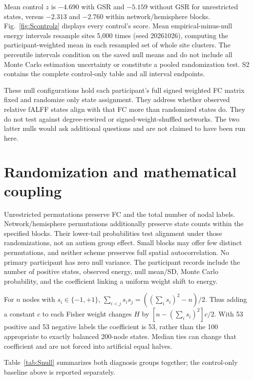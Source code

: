 \documentclass[10pt,letterpaper]{article}
\begin{document}
Mean control $z$ is $-4.690$ with GSR and $-5.159$ without GSR for unrestricted
states, versus $-2.313$ and $-2.760$ within network/hemisphere blocks.
Fig.~\ref{fig:Scontrolz} displays every control's score. Mean empirical-minus-null
energy intervals resample sites 5,000 times (seed 20261026), computing the
participant-weighted mean in each resampled set of whole site clusters. The
percentile intervals condition on the saved null means and do not include all
Monte Carlo estimation uncertainty or constitute a pooled randomization test.
S2 contains the complete control-only table and all interval endpoints.

These null configurations hold each participant's full signed weighted FC matrix
fixed and randomize only state assignment. They address whether observed relative
fALFF states align with that FC more than randomized states do. They do not test
against degree-rewired or signed-weight-shuffled networks. The two latter nulls
would ask additional questions and are not claimed to have been run here.

\section*{Randomization and mathematical coupling}
Unrestricted permutations preserve FC and the total number of nodal labels.
Network/hemisphere permutations additionally preserve state counts within the
specified blocks. Their lower-tail probabilities test alignment under those
randomizations, not an autism group effect. Small blocks may offer few distinct
permutations, and neither scheme preserves full spatial autocorrelation. No
primary participant has zero null variance. The participant records include the
number of positive states, observed energy, null mean/SD, Monte Carlo probability,
and the coefficient linking a uniform weight shift to energy.

For $n$ nodes with $s_i\in\{-1,+1\}$,
$\sum_{i<j}s_i s_j=((\sum_i s_i)^2-n)/2$. Thus adding a constant $c$ to each
Fisher weight changes $H$ by $[n-(\sum_i s_i)^2]c/2$. With 53 positive and
53 negative labels the coefficient is 53, rather than the 100 appropriate to
exactly balanced 200-node states. Median ties can change that coefficient and
are not forced into artificial equal halves.

Table~\ref{tab:Snull} summarizes both diagnosis groups together; the control-only
baseline above is reported separately.

\end{document}
